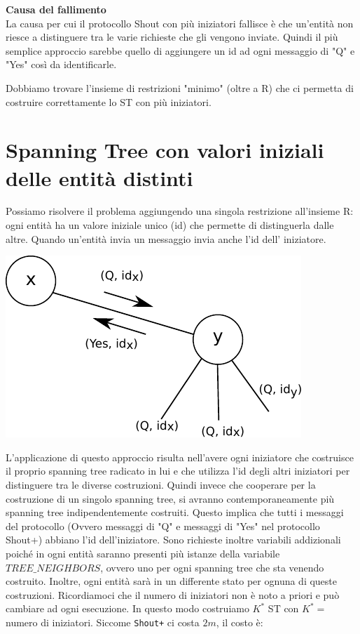 \textbf{Causa del fallimento}\\
La causa per cui il protocollo Shout con più iniziatori fallisce è che un'entità
non riesce a distinguere tra le varie richieste che gli vengono inviate. Quindi
il più semplice approccio sarebbe quello di aggiungere un id ad ogni messaggio
di "Q" e "Yes" così da identificarle.

Dobbiamo trovare l'insieme di restrizioni "minimo" (oltre a R) che ci permetta
di costruire correttamente lo ST con più iniziatori.

\section{Spanning Tree con valori iniziali delle entità distinti}
Possiamo risolvere il problema aggiungendo una singola restrizione all'insieme
R: ogni entità ha un valore iniziale unico (id) che permette di distinguerla
dalle altre. Quando un'entità invia un messaggio invia anche l'id dell'
iniziatore.

\begin{center}
    \includegraphics[scale=0.8]{images/n_38}
\end{center}

L'applicazione di questo approccio risulta nell'avere ogni iniziatore che
costruisce il proprio spanning tree radicato in lui e che utilizza l'id degli
altri iniziatori per distinguere tra le diverse costruzioni. Quindi invece che
cooperare per la costruzione di un singolo spanning tree, si avranno
contemporaneamente più spanning tree indipendentemente costruiti. Questo implica
che  tutti i messaggi del protocollo (Ovvero messaggi di "Q" e messaggi di "Yes"
nel protocollo Shout+) abbiano l'id dell'iniziatore. Sono richieste inoltre
variabili addizionali poiché in ogni entità saranno presenti più istanze della
variabile $TREE\_NEIGHBORS$, ovvero uno per ogni spanning tree che sta venendo
costruito. Inoltre, ogni entità sarà in un differente stato per ognuna di queste
costruzioni. Ricordiamoci che il numero di iniziatori non è noto a priori e può
cambiare ad ogni esecuzione. In questo modo costruiamo $K^*$ ST con $K^*=$
numero di iniziatori. Siccome \texttt{Shout+} ci costa $2m$, il costo è:

